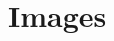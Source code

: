 \documentclass[11pt]{report}
\begin{document}
\section{Images}
\label{appendix_case_images}

%
%
%
%



\printbibliography
\end{document}
